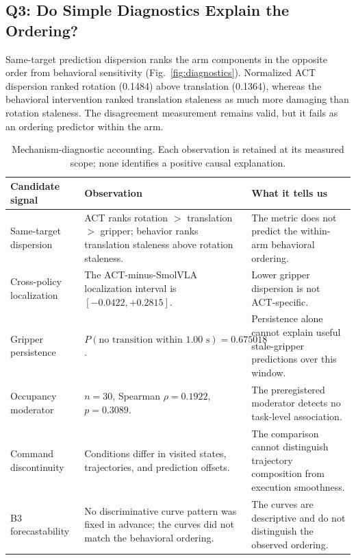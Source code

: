 

\subsection{Q3: Do Simple Diagnostics Explain the Ordering?}

Same-target prediction dispersion ranks the arm components in the opposite
order from behavioral sensitivity (Fig.~\ref{fig:diagnostics}). Normalized ACT
dispersion ranked rotation (0.1484) above translation (0.1364), whereas the
behavioral intervention ranked translation staleness as much more damaging
than rotation staleness. The disagreement measurement remains valid, but it
fails as an ordering predictor within the arm.

\begin{table}[t]
\centering
\caption{Mechanism-diagnostic accounting. Each observation is retained at its
measured scope; none identifies a positive causal explanation.}
\label{tab:mechanisms}
\small
\begin{tabular}{p{}p{}p{}}
\toprule
Candidate signal & Observation & What it tells us \\
\midrule
Same-target dispersion & ACT ranks rotation $>$ translation $>$ gripper;
behavior ranks translation staleness above rotation staleness. & The metric
does not predict the within-arm behavioral ordering. \\
Cross-policy localization & The ACT-minus-SmolVLA localization interval is
$[-0.0422,+0.2815]$. & Lower gripper dispersion is not ACT-specific. \\
Gripper persistence & $P(\text{no transition within 1.00 s})=0.675018$. &
Persistence alone cannot explain useful stale-gripper predictions over this
window. \\
Occupancy moderator & $n=30$, Spearman $\rho=0.1922$, $p=0.3089$. & The
preregistered moderator detects no task-level association. \\
Command discontinuity & Conditions differ in visited states, trajectories,
and prediction offsets. & The comparison cannot distinguish trajectory
composition from execution smoothness. \\
B3 forecastability & No discriminative curve pattern was fixed in advance;
the curves did not match the behavioral ordering. & The curves are descriptive
and do not distinguish the observed ordering. \\
\bottomrule
\end{tabular}
\end{table}

